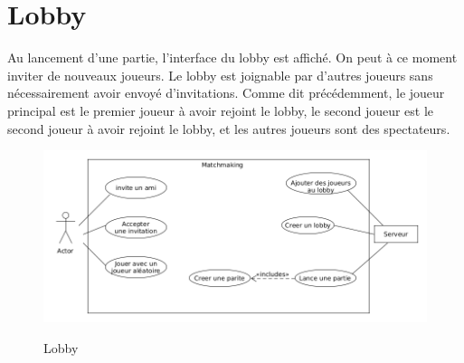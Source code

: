 \documentclass[../besoin_sys.tex]{subfiles}
\begin{document}
\section{Lobby}

Au lancement d'une partie, l'interface du lobby est affiché. On peut à ce moment inviter de nouveaux joueurs. 
Le lobby est joignable par d'autres joueurs sans nécessairement avoir envoyé d'invitations.
Comme dit précédemment, le joueur principal est le premier joueur à avoir rejoint le lobby, le second joueur est le second joueur à avoir rejoint le lobby, et les autres joueurs sont des spectateurs.


\begin{figure}[h]
    \centering
    \includegraphics[scale=0.6]{img_fonctionnel/usecas_sys_matchmaking.png}
    \label{fig:Lobby}
    \caption{Lobby}
\end{figure}
\end{document}
